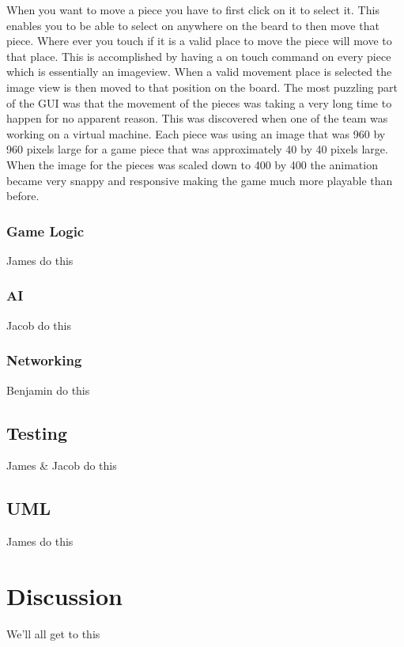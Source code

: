 \documentclass{article}
\begin{document}
	When you want to move a piece you have to first click on it to select it. This enables you to be able to select on anywhere on the beard to then move that piece. Where ever you touch if it is a valid place to move the piece will move to that place. This is accomplished by having a on touch command on every piece which is essentially an imageview. When a valid movement place is selected the image view is then moved to that position on the board. The most puzzling part of the GUI was that the movement of the pieces was taking a very long time to happen for no apparent reason. This was discovered when one of the team was working on a virtual machine. Each piece was using an image that was 960 by 960 pixels large for a game piece that was approximately 40 by 40 pixels large. When the image for the pieces was scaled down to 400 by 400 the animation became very snappy and responsive making the game much more playable than before. 

\subsubsection{Game Logic}
James do this

\subsubsection{AI}
Jacob do this

\subsubsection{Networking}
Benjamin do this

\subsection{Testing}
James \& Jacob do this

\subsection{UML}
James do this

\section{Discussion}
We'll all get to this
\end{document}
